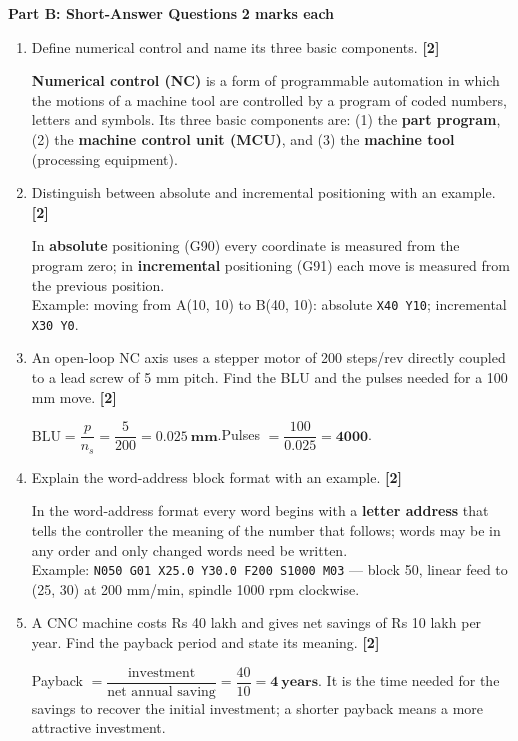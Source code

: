 \documentclass[11pt,a4paper]{article}
\newcommand{\qmarks}[1]{\hfill\textbf{[#1]}}
\newcommand{\partheading}[2]{%
	\bigskip
	\begin{tcolorbox}[colback=cAccent!10, colframe=cAccent, boxrule=0.6pt, arc=2pt, left=6pt, top=3pt, bottom=3pt]
		\textbf{\large #1} \hfill \textbf{#2}
	\end{tcolorbox}}
\begin{document}
	\partheading{Part B: Short-Answer Questions}{2 marks each}
	\begin{enumerate}

		\item Define numerical control and name its three basic components. \qmarks{2}
		\begin{answer}
			\textbf{Numerical control (NC)} is a form of programmable automation in which the motions of a machine tool are controlled by a program of coded numbers, letters and symbols. Its three basic components are: (1) the \textbf{part program}, (2) the \textbf{machine control unit (MCU)}, and (3) the \textbf{machine tool} (processing equipment).
		\end{answer}

		\item Distinguish between absolute and incremental positioning with an example. \qmarks{2}
		\begin{answer}
			In \textbf{absolute} positioning (G90) every coordinate is measured from the program zero; in \textbf{incremental} positioning (G91) each move is measured from the previous position.\\
			Example: moving from A(10, 10) to B(40, 10): absolute \texttt{X40 Y10}; incremental \texttt{X30 Y0}.
		\end{answer}

		\item An open-loop NC axis uses a stepper motor of 200 steps/rev directly coupled to a lead screw of 5 mm pitch. Find the BLU and the pulses needed for a 100 mm move. \qmarks{2}
		\begin{answer}
			$\text{BLU} = \dfrac{p}{n_s} = \dfrac{5}{200} = \mathbf{0.025\ mm}$.\qquad Pulses $= \dfrac{100}{0.025} = \mathbf{4000}$.
		\end{answer}

		\item Explain the word-address block format with an example. \qmarks{2}
		\begin{answer}
			In the word-address format every word begins with a \textbf{letter address} that tells the controller the meaning of the number that follows; words may be in any order and only changed words need be written.\\
			Example: \texttt{N050 G01 X25.0 Y30.0 F200 S1000 M03} --- block 50, linear feed to (25, 30) at 200 mm/min, spindle 1000 rpm clockwise.
		\end{answer}

		\item A CNC machine costs Rs 40 lakh and gives net savings of Rs 10 lakh per year. Find the payback period and state its meaning. \qmarks{2}
		\begin{answer}
			Payback $= \dfrac{\text{investment}}{\text{net annual saving}} = \dfrac{40}{10} = \mathbf{4\ years}$. It is the time needed for the savings to recover the initial investment; a shorter payback means a more attractive investment.
		\end{answer}

	\end{enumerate}
\end{document}

